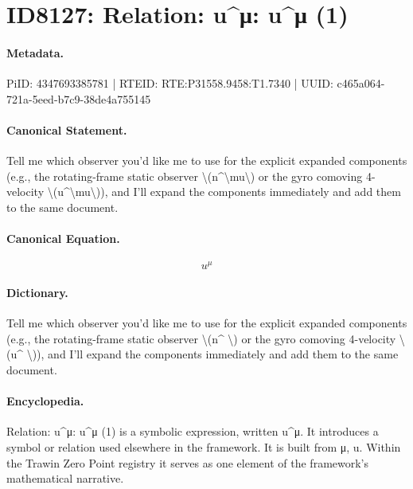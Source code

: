 \section*{ID8127: Relation: u\textasciicircum{}μ: u\textasciicircum{}μ (1)}
\paragraph{Metadata.}
PiID: 4347693385781 | RTEID: RTE:P31558.9458:T1.7340 | UUID: c465a064-721a-5eed-b7c9-38de4a755145

\paragraph{Canonical Statement.}
Tell me which observer you'd like me to use for the explicit expanded components (e.g., the rotating-frame static observer \textbackslash{}(n\textasciicircum{}\textbackslash{}mu\textbackslash{}) or the gyro comoving 4-velocity \textbackslash{}(u\textasciicircum{}\textbackslash{}mu\textbackslash{})), and I’ll expand the components immediately and add them to the same document.

\paragraph{Canonical Equation.}
\[
u^\mu
\]

\paragraph{Dictionary.}
Tell me which observer you'd like me to use for the explicit expanded components (e.g., the rotating-frame static observer \textbackslash{}(n\textasciicircum{} \textbackslash{}) or the gyro comoving 4-velocity \textbackslash{}(u\textasciicircum{} \textbackslash{})), and I’ll expand the components immediately and add them to the same document.

\paragraph{Encyclopedia.}
Relation: u\textasciicircum{}μ: u\textasciicircum{}μ (1) is a symbolic expression, written u\textasciicircum{}μ. It introduces a symbol or relation used elsewhere in the framework. It is built from μ, u. Within the Trawin Zero Point registry it serves as one element of the framework's mathematical narrative.

